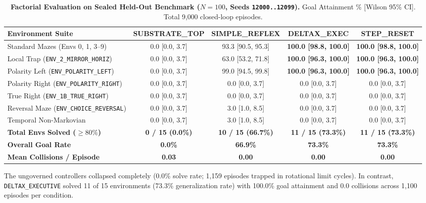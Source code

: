 \documentclass{article}
\begin{document}
\begin{table}[t]
\centering
\small
\caption{\textbf{Factorial Evaluation on Sealed Held-Out Benchmark ($N = 100$, Seeds \texttt{12000..12099}).} Goal Attainment \% [Wilson 95\% CI]. Total 9,000 closed-loop episodes.}
\label{tab:neurips_results}
\begin{tabular*}{\textwidth}{@{\extracolsep{\fill}}lcccc@{}}
\toprule
\textbf{Environment Suite} & \textbf{SUBSTRATE\_TOP} & \textbf{SIMPLE\_REFLEX} & \textbf{DELTAX\_EXEC} & \textbf{STEP\_RESET} \\
\midrule
Standard Mazes (Envs 0, 1, 3--9) & 0.0 [0.0, 3.7] & 93.3 [90.5, 95.3] & \textbf{100.0 [98.8, 100.0]} & \textbf{100.0 [98.8, 100.0]} \\
Local Trap (\texttt{ENV\_2\_MIRROR\_HORIZ}) & 0.0 [0.0, 3.7] & 63.0 [53.2, 71.8] & \textbf{100.0 [96.3, 100.0]} & \textbf{100.0 [96.3, 100.0]} \\
Polarity Left (\texttt{ENV\_POLARITY\_LEFT}) & 0.0 [0.0, 3.7] & 99.0 [94.5, 99.8] & \textbf{100.0 [96.3, 100.0]} & \textbf{100.0 [96.3, 100.0]} \\
Polarity Right (\texttt{ENV\_POLARITY\_RIGHT}) & 0.0 [0.0, 3.7] & 0.0 [0.0, 3.7] & 0.0 [0.0, 3.7] & 0.0 [0.0, 3.7] \\
True Right (\texttt{ENV\_1B\_TRUE\_RIGHT}) & 0.0 [0.0, 3.7] & 0.0 [0.0, 3.7] & 0.0 [0.0, 3.7] & 0.0 [0.0, 3.7] \\
Reversal Maze (\texttt{ENV\_CHOICE\_REVERSAL}) & 0.0 [0.0, 3.7] & 3.0 [1.0, 8.5] & 0.0 [0.0, 3.7] & 0.0 [0.0, 3.7] \\
Temporal Non-Markovian & 0.0 [0.0, 3.7] & 3.0 [1.0, 8.5] & 0.0 [0.0, 3.7] & 0.0 [0.0, 3.7] \\
\midrule
\textbf{Total Envs Solved ($\ge 80\%$)} & \textbf{0 / 15 (0.0\%)} & \textbf{10 / 15 (66.7\%)} & \textbf{11 / 15 (73.3\%)} & \textbf{11 / 15 (73.3\%)} \\
\textbf{Overall Goal Rate} & \textbf{0.0\%} & \textbf{66.9\%} & \textbf{73.3\%} & \textbf{73.3\%} \\
\textbf{Mean Collisions / Episode} & \textbf{0.03} & \textbf{0.00} & \textbf{0.00} & \textbf{0.00} \\
\bottomrule
\end{tabular*}
\end{table}

The ungoverned controllers collapsed completely (0.0\% solve rate; 1,159 episodes trapped in rotational limit cycles). In contrast, \texttt{DELTAX\_EXECUTIVE} solved 11 of 15 environments (73.3\% generalization rate) with 100.0\% goal attainment and 0.0 collisions across 1,100 episodes per condition.
\end{document}

